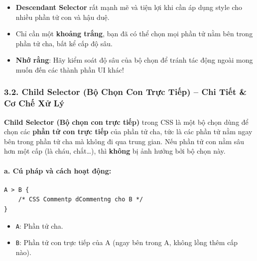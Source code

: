\documentclass[11pt,oneside]{book}
\newcommand{\codeinline}[1]{\textcolor{accentOrange}{\texttt{#1}}}
\begin{document}
\begin{tipBox}
\begin{itemize}[leftmargin=1.5em, itemsep=3pt, parsep=0pt]
    \item \textbf{Descendant Selector} rất mạnh mẽ và tiện lợi khi cần áp dụng style cho nhiều phần tử con và hậu duệ.
    \item Chỉ cần một \textbf{khoảng trắng}, bạn đã có thể chọn mọi phần tử nằm bên trong phần tử cha, bất kể cấp độ sâu.
    \item \textbf{Nhớ rằng}: Hãy kiểm soát độ sâu của bộ chọn để tránh tác động ngoài mong muốn đến các thành phần UI khác!
\end{itemize}
\end{tipBox}

\subsubsection{3.2. Child Selector (Bộ Chọn Con Trực Tiếp) -- Chi Tiết \& Cơ Chế Xử Lý}

\begin{conceptBox}
\textbf{Child Selector (Bộ chọn con trực tiếp)} trong CSS là một bộ chọn dùng để chọn các \textbf{phần tử con trực tiếp} của phần tử cha, tức là các phần tử nằm ngay bên trong phần tử cha mà không đi qua trung gian. Nếu phần tử con nằm sâu hơn một cấp (là cháu, chắt\ldots), thì \textbf{không} bị ảnh hưởng bởi bộ chọn này.
\end{conceptBox}

\paragraph{a. Cú pháp và cách hoạt động:}
\begin{codeWindow}
\begin{lstlisting}[language=CSS3]
A > B {
    /* CSS Commentp dCommentng cho B */
}
\end{lstlisting}
\end{codeWindow}

\begin{itemize}[leftmargin=1.5em, itemsep=2pt, parsep=0pt]
    \item \codeinline{A}: Phần tử cha.
    \item \codeinline{B}: Phần tử con trực tiếp của A (ngay bên trong A, không lồng thêm cấp nào).
\end{itemize}
\end{document}
